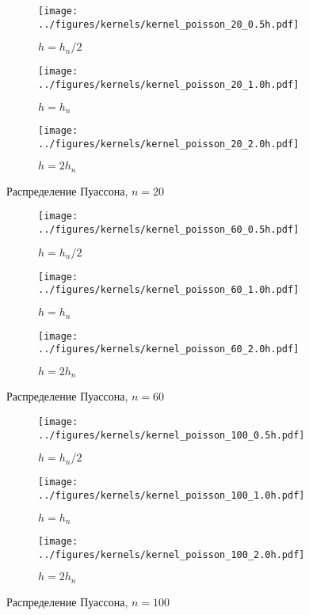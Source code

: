 \documentclass[12pt]{article}
\begin{document}
	\begin{figure}[H]
		\centering
		\begin{subfigure}[t]{.3\linewidth}
			\centering\texttt{[image: ../figures/kernels/kernel\_poisson\_20\_0.5h.pdf]}
			\caption*{$h = h_n/2$}
		\end{subfigure}
		\begin{subfigure}[t]{.3\linewidth}
			\centering\texttt{[image: ../figures/kernels/kernel\_poisson\_20\_1.0h.pdf]}
			\caption*{$h = h_n$}
		\end{subfigure}
		\begin{subfigure}[t]{.3\linewidth}
			\centering\texttt{[image: ../figures/kernels/kernel\_poisson\_20\_2.0h.pdf]}
			\caption*{$h = 2h_n$}
		\end{subfigure}
		\caption{Распределение Пуассона, $n = 20$}
	\end{figure}
	\begin{figure}[H]
		\centering
		\begin{subfigure}[t]{.3\linewidth}
			\centering\texttt{[image: ../figures/kernels/kernel\_poisson\_60\_0.5h.pdf]}
			\caption*{$h = h_n/2$}
		\end{subfigure}
		\begin{subfigure}[t]{.3\linewidth}
			\centering\texttt{[image: ../figures/kernels/kernel\_poisson\_60\_1.0h.pdf]}
			\caption*{$h = h_n$}
		\end{subfigure}
		\begin{subfigure}[t]{.3\linewidth}
			\centering\texttt{[image: ../figures/kernels/kernel\_poisson\_60\_2.0h.pdf]}
			\caption*{$h = 2h_n$}
		\end{subfigure}
		\caption{Распределение Пуассона, $n = 60$}
	\end{figure}
	\begin{figure}[H]
		\centering
		\begin{subfigure}[t]{.3\linewidth}
			\centering\texttt{[image: ../figures/kernels/kernel\_poisson\_100\_0.5h.pdf]}
			\caption*{$h = h_n/2$}
		\end{subfigure}
		\begin{subfigure}[t]{.3\linewidth}
			\centering\texttt{[image: ../figures/kernels/kernel\_poisson\_100\_1.0h.pdf]}
			\caption*{$h = h_n$}
		\end{subfigure}
		\begin{subfigure}[t]{.3\linewidth}
			\centering\texttt{[image: ../figures/kernels/kernel\_poisson\_100\_2.0h.pdf]}
			\caption*{$h = 2h_n$}
		\end{subfigure}
		\caption{Распределение Пуассона, $n = 100$}
	\end{figure}
\end{document}
